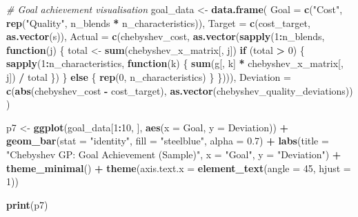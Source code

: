 \documentclass[
]{article}
\newenvironment{Shaded}{\begin{snugshade}}{\end{snugshade}}
\newcommand{\AttributeTok}[1]{\textcolor[rgb]{0.13,0.29,0.53}{#1}}
\newcommand{\CommentTok}[1]{\textcolor[rgb]{0.56,0.35,0.01}{\textit{#1}}}
\newcommand{\ControlFlowTok}[1]{\textcolor[rgb]{0.13,0.29,0.53}{\textbf{#1}}}
\newcommand{\DecValTok}[1]{\textcolor[rgb]{0.00,0.00,0.81}{#1}}
\newcommand{\FloatTok}[1]{\textcolor[rgb]{0.00,0.00,0.81}{#1}}
\newcommand{\FunctionTok}[1]{\textcolor[rgb]{0.13,0.29,0.53}{\textbf{#1}}}
\newcommand{\NormalTok}[1]{#1}
\newcommand{\OtherTok}[1]{\textcolor[rgb]{0.56,0.35,0.01}{#1}}
\newcommand{\SpecialCharTok}[1]{\textcolor[rgb]{0.81,0.36,0.00}{\textbf{#1}}}
\newcommand{\StringTok}[1]{\textcolor[rgb]{0.31,0.60,0.02}{#1}}
\begin{document}
\begin{Shaded}
\begin{Highlighting}[]
\CommentTok{\# Goal achievement visualisation}
\NormalTok{goal\_data }\OtherTok{\textless{}{-}} \FunctionTok{data.frame}\NormalTok{(}
  \AttributeTok{Goal =} \FunctionTok{c}\NormalTok{(}\StringTok{"Cost"}\NormalTok{, }\FunctionTok{rep}\NormalTok{(}\StringTok{"Quality"}\NormalTok{, n\_blends }\SpecialCharTok{*}\NormalTok{ n\_characteristics)),}
  \AttributeTok{Target =} \FunctionTok{c}\NormalTok{(cost\_target, }\FunctionTok{as.vector}\NormalTok{(s)),}
  \AttributeTok{Actual =} \FunctionTok{c}\NormalTok{(chebyshev\_cost, }
             \FunctionTok{as.vector}\NormalTok{(}\FunctionTok{sapply}\NormalTok{(}\DecValTok{1}\SpecialCharTok{:}\NormalTok{n\_blends, }\ControlFlowTok{function}\NormalTok{(j) \{}
\NormalTok{               total }\OtherTok{\textless{}{-}} \FunctionTok{sum}\NormalTok{(chebyshev\_x\_matrix[, j])}
               \ControlFlowTok{if}\NormalTok{ (total }\SpecialCharTok{\textgreater{}} \DecValTok{0}\NormalTok{) \{}
                 \FunctionTok{sapply}\NormalTok{(}\DecValTok{1}\SpecialCharTok{:}\NormalTok{n\_characteristics, }\ControlFlowTok{function}\NormalTok{(k) \{}
                   \FunctionTok{sum}\NormalTok{(g[, k] }\SpecialCharTok{*}\NormalTok{ chebyshev\_x\_matrix[, j]) }\SpecialCharTok{/}\NormalTok{ total}
\NormalTok{                 \})}
\NormalTok{               \} }\ControlFlowTok{else}\NormalTok{ \{}
                 \FunctionTok{rep}\NormalTok{(}\DecValTok{0}\NormalTok{, n\_characteristics)}
\NormalTok{               \}}
\NormalTok{             \}))),}
  \AttributeTok{Deviation =} \FunctionTok{c}\NormalTok{(}\FunctionTok{abs}\NormalTok{(chebyshev\_cost }\SpecialCharTok{{-}}\NormalTok{ cost\_target), }\FunctionTok{as.vector}\NormalTok{(chebyshev\_quality\_deviations))}
\NormalTok{)}

\NormalTok{p7 }\OtherTok{\textless{}{-}} \FunctionTok{ggplot}\NormalTok{(goal\_data[}\DecValTok{1}\SpecialCharTok{:}\DecValTok{10}\NormalTok{, ], }\FunctionTok{aes}\NormalTok{(}\AttributeTok{x =}\NormalTok{ Goal, }\AttributeTok{y =}\NormalTok{ Deviation)) }\SpecialCharTok{+}
  \FunctionTok{geom\_bar}\NormalTok{(}\AttributeTok{stat =} \StringTok{"identity"}\NormalTok{, }\AttributeTok{fill =} \StringTok{"steelblue"}\NormalTok{, }\AttributeTok{alpha =} \FloatTok{0.7}\NormalTok{) }\SpecialCharTok{+}
  \FunctionTok{labs}\NormalTok{(}\AttributeTok{title =} \StringTok{"Chebyshev GP: Goal Achievement (Sample)"}\NormalTok{,}
       \AttributeTok{x =} \StringTok{"Goal"}\NormalTok{, }\AttributeTok{y =} \StringTok{"Deviation"}\NormalTok{) }\SpecialCharTok{+}
  \FunctionTok{theme\_minimal}\NormalTok{() }\SpecialCharTok{+}
  \FunctionTok{theme}\NormalTok{(}\AttributeTok{axis.text.x =} \FunctionTok{element\_text}\NormalTok{(}\AttributeTok{angle =} \DecValTok{45}\NormalTok{, }\AttributeTok{hjust =} \DecValTok{1}\NormalTok{))}

\FunctionTok{print}\NormalTok{(p7)}
\end{Highlighting}
\end{Shaded}
\end{document}
